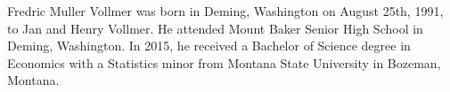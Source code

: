 
Fredric Muller Vollmer was born in Deming, Washington on August 25th, 1991, to Jan and Henry Vollmer. He attended Mount Baker Senior High School in Deming, Washington. In 2015, he received a Bachelor of Science degree in Economics with a Statistics minor from Montana State University in Bozeman, Montana.
